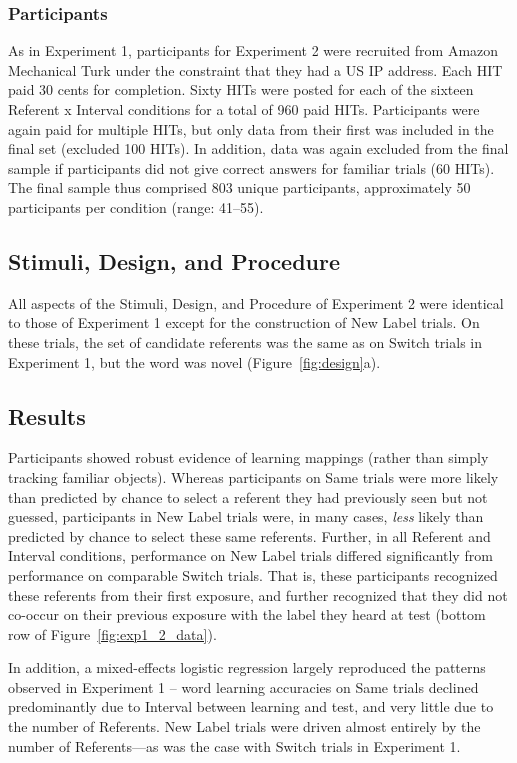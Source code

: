 \documentclass{pnastwo}
\begin{document}
\begin{article}
\subsubsection{Participants}

As in Experiment 1, participants for Experiment 2 were recruited from Amazon Mechanical Turk under the constraint that they had a US IP address. Each HIT paid 30 cents for completion. Sixty HITs were posted for each of the sixteen Referent x Interval conditions for a total of 960 paid HITs. Participants were again paid for multiple HITs, but only data from their first was included in the final set (excluded 100 HITs). In addition, data was again excluded from the final sample if participants did not give correct answers for familiar trials (60 HITs). The final sample thus comprised 803 unique participants, approximately 50 participants per condition (range: 41--55).

\subsection{Stimuli, Design, and Procedure}

All aspects of the Stimuli, Design, and Procedure of Experiment 2 were identical to those of Experiment 1 except for the construction of New Label trials. On these trials, the set of candidate referents was the same as on Switch trials in Experiment 1, but the word was novel (Figure~\ref{fig:design}a).

\subsection{Results}

Participants showed robust evidence of learning mappings (rather than simply tracking familiar objects). Whereas participants on Same trials were more likely than predicted by chance to select a referent they had previously seen but not guessed, participants in New Label trials were, in many cases, \emph{less} likely than predicted by chance to select these same referents. Further, in all Referent and Interval conditions, performance on New Label trials differed significantly from performance on comparable Switch trials. That is, these participants recognized these referents from their first exposure, and further recognized that they did not co-occur on their previous exposure with the label they heard at test (bottom row of Figure~\ref{fig:exp1_2_data}).

In addition, a mixed-effects logistic regression largely reproduced the patterns observed in Experiment 1 -- word learning accuracies on Same trials declined predominantly due to Interval between learning and test, and very little due to the number of Referents. New Label trials were driven almost entirely by the number of Referents---as was the case with Switch trials in Experiment 1.


\end{article}
\end{document}
